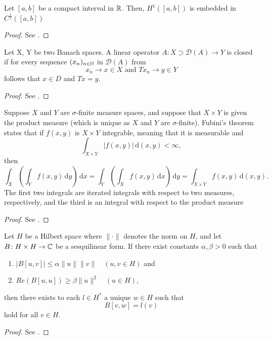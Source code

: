 \begin{atheorem} \label{embhc}
	Let $[a, b]$ be a compact interval in $\mathbb{R}$. Then, $H^{1}([a, b])$ is embedded in $C^{\frac{1}{2}}([a, b])$
	
	\begin{proof}
		See \cite[p. 269]{evans1998partial}.
	\end{proof}
\end{atheorem}

\begin{atheorem}
	Let X, Y be two Banach spaces. A linear operator $A \colon X \supset \mathcal{D}(A)  \rightarrow Y$ is closed if for every sequence $(x_n)_{n \in \mathbb{N}}$ in $\mathcal{D}(A)$ from
	\[ x_{n} \rightarrow x \in X \text{ and } Tx_{n} \rightarrow y \in Y \]
	follows that $x \in D$ and $Tx = y$.

	\begin{proof}
		 See \cite[p. 156]{werner2006funkana}.
	\end{proof}
\end{atheorem}	

\begin{atheorem}
	Suppose $X$ and $Y$ are $\sigma$-finite measure spaces, and suppose that $X \times Y$ is given the product measure (which is unique as $X$ and $Y$ are $\sigma$-finite). Fubini's theorem states that if $f(x,y)$ is $X \times Y$ integrable, meaning that it is measurable and
		\[  \int_{X\times Y} |f(x,y)|\,\text{d}(x,y)<\infty, \]
	then
		\[ \int_X\left(\int_Y f(x,y)\,\text{d}y\right)\,\text{d}x=\int_Y\left(\int_X f(x,y)\,\text{d}x\right)\,\text{d}y=\int_{X\times Y} f(x,y)\,\text{d}(x,y). \]
	The first two integrals are iterated integrals with respect to two measures, respectively, and the third is an integral with respect to the product measure

	\begin{proof}
		See \cite[p. 514]{werner2006funkana}.
	\end{proof}
\end{atheorem}

\begin{atheorem}
	Let $H$ be a Hilbert space where $\| \cdot \|$ denotes the norm on $H$, and let $B \colon H \times H \rightarrow \mathbb{C}$ be a sesquilinear form. If there exist constants $\alpha, \beta > 0$ such that
	\begin{enumerate}[label=\alph*\upshape)]
		\item $\left| B[u, v] \right| \leq \alpha \| u \| \|v \| \quad (u, v \in H)$ and
		\item $Re(B[u,u]) \geq \beta \|u\|^{2} \quad (u \in H)$,
	\end{enumerate}
	then there exists to each $l \in H^{*}$ a unique $w \in H$ such that
		\[ B[v, w] = l(v) \]
	hold for all $v \in H$.
		
	\begin{proof}
		See \cite[Amd to problem 51]{plum2015dglhr}.
	\end{proof}
\end{atheorem}

